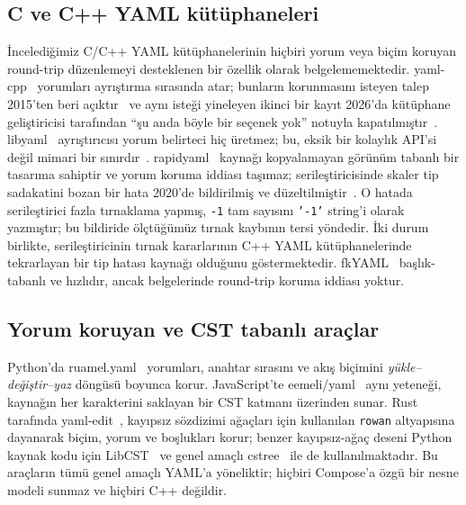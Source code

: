 \documentclass[conference]{IEEEtran}
\begin{document}
\subsection{C ve C++ YAML kütüphaneleri}
İncelediğimiz C/C++ YAML kütüphanelerinin hiçbiri yorum veya biçim koruyan
round-trip düzenlemeyi desteklenen bir özellik olarak belgelememektedir.
yaml-cpp~\cite{yamlcpp} yorumları ayrıştırma sırasında atar; bunların
korunmasını isteyen talep 2015'ten beri açıktır~\cite{yamlcpp_issue154} ve
aynı isteği yineleyen ikinci bir kayıt 2026'da kütüphane geliştiricisi
tarafından ``şu anda böyle bir seçenek yok'' notuyla kapatılmıştır~\cite{yamlcpp_issue457}.
libyaml~\cite{libyaml} ayrıştırıcısı yorum belirteci hiç üretmez; bu,
eksik bir kolaylık API'si değil mimari bir sınırdır~\cite{libyaml_issue42}.
rapidyaml~\cite{rapidyaml} kaynağı kopyalamayan görünüm tabanlı bir tasarıma
sahiptir ve yorum koruma iddiası taşımaz; serileştiricisinde skaler tip
sadakatini bozan bir hata 2020'de bildirilmiş ve düzeltilmiştir~\cite{rapidyaml_issue30}.
O hatada serileştirici fazla tırnaklama yapmış, \texttt{-1} tam sayısını
\texttt{'-1'} string'i olarak yazmıştır; bu bildiride ölçtüğümüz tırnak
kaybının tersi yöndedir. İki durum birlikte, serileştiricinin tırnak
kararlarının C++ YAML kütüphanelerinde tekrarlayan bir tip hatası kaynağı
olduğunu göstermektedir.
fkYAML~\cite{fkyaml} başlık-tabanlı ve hızlıdır, ancak belgelerinde
round-trip koruma iddiası yoktur.

\subsection{Yorum koruyan ve CST tabanlı araçlar}
Python'da ruamel.yaml~\cite{ruamelyaml} yorumları, anahtar sırasını ve akış
biçimini \emph{yükle--değiştir--yaz} döngüsü boyunca korur.
JavaScript'te eemeli/yaml~\cite{eemeliyaml} aynı yeteneği, kaynağın her
karakterini saklayan bir CST katmanı üzerinden sunar. Rust tarafında
yaml-edit~\cite{yamledit_rust}, kayıpsız sözdizimi ağaçları için kullanılan
\texttt{rowan} altyapısına dayanarak biçim, yorum ve boşlukları korur;
benzer kayıpsız-ağaç deseni Python kaynak kodu için LibCST~\cite{libcst} ve
genel amaçlı cstree~\cite{cstree} ile de kullanılmaktadır. Bu araçların
tümü genel amaçlı YAML'a yöneliktir; hiçbiri Compose'a özgü bir nesne
modeli sunmaz ve hiçbiri C++ değildir.
\end{document}
